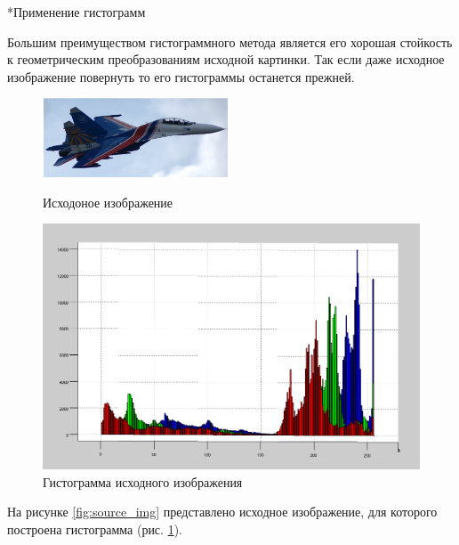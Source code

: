 \documentclass[a4paper,12pt,titlpage]{posobie}
\makeatletter
\renewcommand{\subsection}{\@startsection{subsection}{2}{0.0cm}{0.3cm}{0.1cm}%
             {\fontsize{14}{16}\bf\selectfont }}
\makeatother
\begin{document}
\subsection*{Применение гистограмм}
     
     Большим преимуществом гистограммного метода является его хорошая стойкость к геометрическим преобразованиям исходной 
картинки. Так если даже исходное изображение повернуть то его гистограммы останется прежней. 

\begin{figure}[h]
 \parbox[h]{0.49\textwidth}{\centering
   \includegraphics[width=0.49\textwidth]{mig.png}
   \caption{Исходоное изображение}\label{fig:source_img}}
   \hfil\hfil%
   \begin{minipage}[h]{0.49\textwidth}
     \centering
     \includegraphics[width=\textwidth]{mig_gist.png}
     \caption{Гистограмма исходного изображения}\label{fig:source_img_gist}
   \end{minipage}
\end{figure}
     На рисунке \ref{fig:source_img} представлено исходное изображение, для которого построена гистограмма (рис. \ref{fig:source_img_gist}). 
\end{document}
